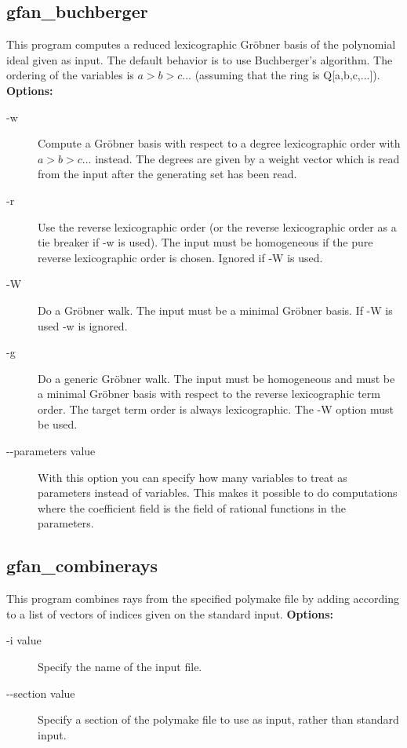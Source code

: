 {{\subsection{gfan\_buchberger}\label{applist:_buchberger}
This program computes a reduced lexicographic Gr\"obner basis of the polynomial ideal given as input. The default behavior is to use Buchberger's algorithm. The ordering of the variables is $a>b>c...$ (assuming that the ring is Q[a,b,c,...]).
\newline
{\bf Options:}
\begin{description}
\item[-w]Compute a Gr\"obner basis with respect to a degree lexicographic order with $a>b>c...$ instead. The degrees are given by a weight vector which is read from the input after the generating set has been read.
\item[-r]Use the reverse lexicographic order (or the reverse lexicographic order as a tie breaker if -w is used). The input must be homogeneous if the pure reverse lexicographic order is chosen. Ignored if -W is used.
\item[-W]Do a Gr\"obner walk. The input must be a minimal Gr\"obner basis. If -W is used -w is ignored.
\item[-g]Do a generic Gr\"obner walk. The input must be homogeneous and must be a minimal Gr\"obner basis with respect to the reverse lexicographic term order. The target term order is always lexicographic. The -W option must be used.
\item[-\hspace{0.013cm}-parameters value]With this option you can specify how many variables to treat as parameters instead of variables. This makes it possible to do computations where the coefficient field is the field of rational functions in the parameters.\end{description}


{\subsection{gfan\_combinerays}\label{applist:_combinerays}
This program combines rays from the specified polymake file by adding according to a list of vectors of indices given on the standard input.
\newline
{\bf Options:}
\begin{description}
\item[-i value]Specify the name of the input file.\item[-\hspace{0.013cm}-section value]Specify a section of the polymake file to use as input, rather than standard input.\end{description}


}}}
